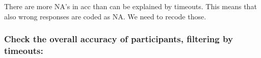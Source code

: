 \documentclass[
]{article}
\newenvironment{Shaded}{\begin{snugshade}}{\end{snugshade}}
\newcommand{\CommentTok}[1]{\textcolor[rgb]{0.56,0.35,0.01}{\textit{#1}}}
\newcommand{\DataTypeTok}[1]{\textcolor[rgb]{0.13,0.29,0.53}{#1}}
\newcommand{\DecValTok}[1]{\textcolor[rgb]{0.00,0.00,0.81}{#1}}
\newcommand{\KeywordTok}[1]{\textcolor[rgb]{0.13,0.29,0.53}{\textbf{#1}}}
\newcommand{\NormalTok}[1]{#1}
\newcommand{\OperatorTok}[1]{\textcolor[rgb]{0.81,0.36,0.00}{\textbf{#1}}}
\newcommand{\StringTok}[1]{\textcolor[rgb]{0.31,0.60,0.02}{#1}}
\begin{document}
There are more NA's in acc than can be explained by timeouts. This means
that also wrong responses are coded as NA. We need to recode those.

\begin{Shaded}
\end{Shaded}

\hypertarget{check-the-overall-accuracy-of-participants-filtering-by-timeouts}{%
\subsubsection{Check the overall accuracy of participants, filtering by
timeouts:}\label{check-the-overall-accuracy-of-participants-filtering-by-timeouts}}

\begin{Shaded}
\end{Shaded}
\end{document}
